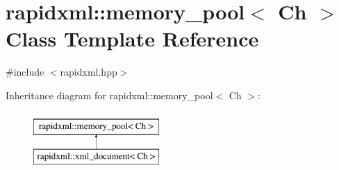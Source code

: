 \hypertarget{classrapidxml_1_1memory__pool}{}\section{rapidxml\+:\+:memory\+\_\+pool$<$ Ch $>$ Class Template Reference}
\label{classrapidxml_1_1memory__pool}


{\ttfamily \#include $<$rapidxml.\+hpp$>$}

Inheritance diagram for rapidxml\+:\+:memory\+\_\+pool$<$ Ch $>$\+:\begin{figure}[H]
\begin{center}
\leavevmode
\includegraphics[height=2.000000cm]{classrapidxml_1_1memory__pool}
\end{center}
\end{figure}
